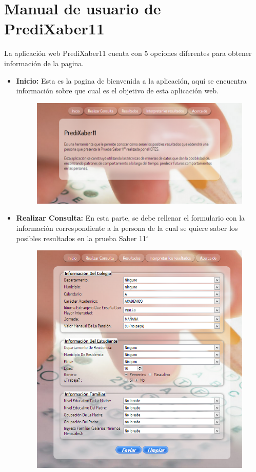 \documentclass{article}
\begin{document}
\section{Manual de usuario de PrediXaber11}
La aplicación web PrediXaber11 cuenta con 5 opciones diferentes para obtener información de la pagina.
\begin{itemize}
\item \textbf{Inicio:} Esta es la pagina de bienvenida a la aplicación, aquí se encuentra información sobre que cual es el objetivo de esta aplicación web.
\begin{figure}[H]
\begin{centering}
\includegraphics[scale=0.4]{inicio}
\par\end{centering}
\label{fig:figura6}
\end{figure}
\item \textbf{Realizar Consulta:} En esta parte, se debe rellenar el formulario con la información correspondiente a la persona de la cual se quiere saber los posibles resultados en la prueba Saber 11{\ensuremath{^\circ}}
\begin{figure}[H]
\begin{centering}
\includegraphics[scale=0.5]{consultar}

\end{centering}
\end{figure}
\end{itemize}
\end{document}
